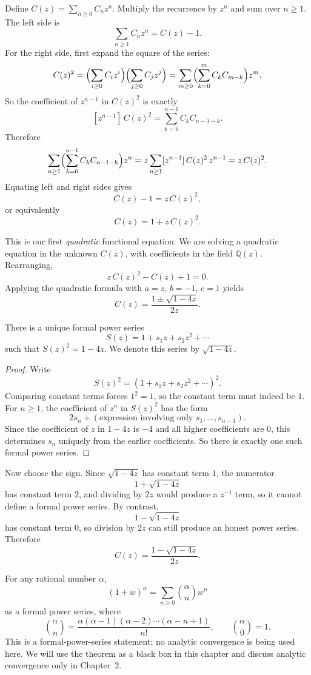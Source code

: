 Define $C(z)=\sum_{n \ge 0} C_n z^n$. Multiply the recurrence by $z^n$ and sum over $n \ge 1$. The left side is
\[
  \sum_{n \ge 1} C_n z^n = C(z)-1.
\]
For the right side, first expand the square of the series:
\[
  C(z)^2
  = \Bigl(\sum_{i \ge 0} C_i z^i\Bigr)\Bigl(\sum_{j \ge 0} C_j z^j\Bigr)
  = \sum_{m \ge 0}\Bigl(\sum_{k=0}^m C_k C_{m-k}\Bigr) z^m.
\]
So the coefficient of $z^{n-1}$ in $C(z)^2$ is exactly
\[
  [z^{n-1}]\,C(z)^2 = \sum_{k=0}^{n-1} C_k C_{n-1-k}.
\]
Therefore
\[
  \sum_{n \ge 1}\Bigl(\sum_{k=0}^{n-1} C_k C_{n-1-k}\Bigr) z^n
  = z\sum_{n \ge 1} [z^{n-1}]\,C(z)^2\, z^{n-1}
  = z\,C(z)^2.
\]
Equating left and right sides gives
\[
  C(z)-1 = z\,C(z)^2,
\]
or equivalently
\[
  C(z) = 1 + z\,C(z)^2.
\]

This is our first \emph{quadratic} functional equation. We are solving a quadratic equation in the unknown $C(z)$, with coefficients in the field $\mathbb{Q}(z)$. Rearranging,
\[
  z\,C(z)^2 - C(z) + 1 = 0.
\]
Applying the quadratic formula with $a=z$, $b=-1$, $c=1$ yields
\[
  C(z) = \frac{1 \pm \sqrt{1-4z}}{2z}.
\]

\begin{lemma}
There is a unique formal power series
\[
  S(z) = 1 + s_1 z + s_2 z^2 + \cdots
\]
such that $S(z)^2 = 1-4z$. We denote this series by $\sqrt{1-4z}$.
\end{lemma}

\begin{proof}
Write
\[
  S(z)^2 = (1+s_1 z + s_2 z^2 + \cdots)^2.
\]
Comparing constant terms forces $1^2=1$, so the constant term must indeed be $1$. For $n \ge 1$, the coefficient of $z^n$ in $S(z)^2$ has the form
\[
  2s_n + (\text{expression involving only } s_1,\dots,s_{n-1}).
\]
Since the coefficient of $z$ in $1-4z$ is $-4$ and all higher coefficients are $0$, this determines $s_n$ uniquely from the earlier coefficients. So there is exactly one such formal power series.
\end{proof}

Now choose the sign. Since $\sqrt{1-4z}$ has constant term $1$, the numerator
\[
  1 + \sqrt{1-4z}
\]
has constant term $2$, and dividing by $2z$ would produce a $z^{-1}$ term, so it cannot define a formal power series. By contrast,
\[
  1 - \sqrt{1-4z}
\]
has constant term $0$, so division by $2z$ can still produce an honest power series. Therefore
\[
  C(z) = \frac{1-\sqrt{1-4z}}{2z}.
\]

\begin{theorem}
For any rational number $\alpha$,
\[
  (1+w)^\alpha = \sum_{n \ge 0} \binom{\alpha}{n} w^n
\]
as a formal power series, where
\[
  \binom{\alpha}{n}
  = \frac{\alpha(\alpha-1)(\alpha-2)\cdots(\alpha-n+1)}{n!},
  \qquad \binom{\alpha}{0}=1.
\]
This is a formal-power-series statement; no analytic convergence is being used here. We will use the theorem as a black box in this chapter and discuss analytic convergence only in Chapter~2.
\end{theorem}


